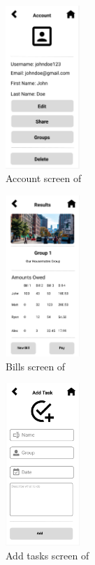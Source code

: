 \documentclass[12pt, titlepage]{article}
\begin{document}
\begin{figure}[H]
\centering
\includegraphics[width=0.25\textwidth]{Account.png}
\caption{Account screen of \progname{}}
\label{FigAccount}
\end{figure}


\begin{figure}[H]
\centering
\includegraphics[width=0.25\textwidth]{Bills.png}
\caption{Bills screen of \progname{}}
\label{FigBills}
\end{figure}

\begin{figure}[H]
\centering
\includegraphics[width=0.25\textwidth]{Task.png}
\caption{Add tasks screen of \progname{}}
\label{FigTasks}
\end{figure}
\end{document}
